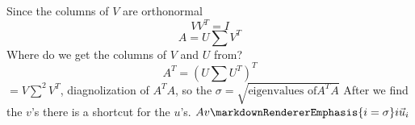 \markdownRendererInterblockSeparator
{}Since the columns of $V$ are orthonormal\markdownRendererEllipsis{}\markdownRendererInterblockSeparator
{}$$VV^T=I$$\markdownRendererInterblockSeparator
{}$$A = U\sum V^T$$\markdownRendererInterblockSeparator
{}Where do we get the columns of $V$ and $U$ from?\markdownRendererInterblockSeparator
{}$$A^T = (U\sum U^T)^T$$\markdownRendererInterblockSeparator
{}$=V\sum^2 V^T$, diagnolization of $A^TA$, so the $\sigma=\sqrt{\text{eigenvalues of}A^TA}$\markdownRendererInterblockSeparator
{}After we find the $v$'s there is a shortcut for the $u$'s.\markdownRendererInterblockSeparator
{}$Av\markdownRendererEmphasis{i=\sigma}i\vec{u}_i$\relax